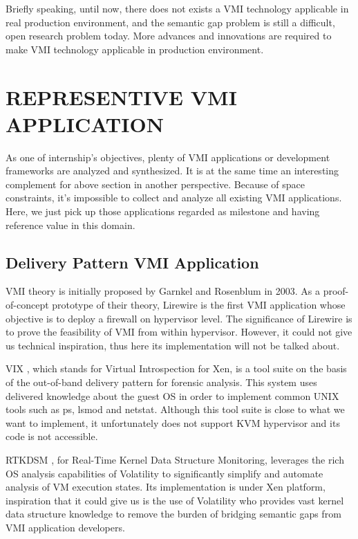 Briefly speaking, until now, there does not exists a VMI technology applicable in real production environment, and the semantic gap 
problem is still a difficult, open research problem today. More advances and innovations are required to make VMI technology applicable
in production environment.

\section{REPRESENTIVE VMI APPLICATION}

As one of internship’s objectives, plenty of VMI applications or development frameworks are analyzed and synthesized. It is at the same time an 
interesting complement for above section in another perspective. Because of space constraints, it’s impossible to collect and analyze all 
existing VMI applications. Here, we just pick up those applications regarded as milestone and having reference value in this domain.

\subsection{Delivery Pattern VMI Application}

VMI theory is initially proposed by Garnkel and Rosenblum  \cite{Reference1} in 2003. As a proof-of-concept prototype of their theory, Lirewire  
\cite{Reference1} is the first VMI application whose objective is to deploy a firewall on hypervisor level. The significance of Lirewire is to 
prove the feasibility of VMI from within hypervisor. However, it could not give us technical inspiration, thus here its implementation will not 
be talked about.

VIX  \cite{Reference10}, which stands for Virtual Introspection for Xen, is a tool suite on the basis of the out-of-band delivery pattern for 
forensic analysis. This system uses delivered knowledge about the guest OS in order to implement common UNIX tools such as ps, lsmod and netstat.
Although this tool suite is close to what we want to implement, it unfortunately does not support KVM hypervisor and its code is not accessible.

RTKDSM  \cite{Reference3}, for Real-Time Kernel Data Structure Monitoring, leverages the rich OS analysis capabilities of Volatility  \cite{Reference13}
to significantly simplify and automate analysis of VM execution states. Its implementation is under Xen platform, inspiration that it could give us 
is the use of Volatility who provides vast kernel data structure knowledge to remove the burden of bridging semantic gaps from VMI application 
developers.

